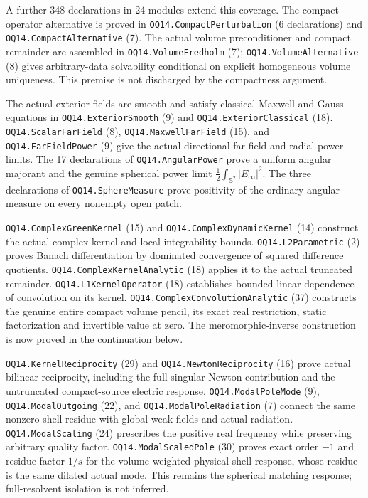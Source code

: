A further 348 declarations in 24 modules extend this coverage.
The compact-operator alternative is proved in
\texttt{OQ14.\allowbreak CompactPerturbation} (6 declarations) and
\texttt{OQ14.\allowbreak CompactAlternative} (7).
The actual volume preconditioner and compact remainder are assembled in
\texttt{OQ14.\allowbreak VolumeFredholm} (7);
\texttt{OQ14.\allowbreak VolumeAlternative} (8) gives arbitrary-data
solvability conditional on explicit homogeneous volume uniqueness.
This premise is not discharged by the compactness argument.

The actual exterior fields are smooth and satisfy classical Maxwell and
Gauss equations in \texttt{OQ14.\allowbreak ExteriorSmooth} (9) and
\texttt{OQ14.\allowbreak ExteriorClassical} (18).
\texttt{OQ14.\allowbreak ScalarFarField} (8),
\texttt{OQ14.\allowbreak MaxwellFarField} (15), and
\texttt{OQ14.\allowbreak FarFieldPower} (9) give the actual directional
far-field and radial power limits. The 17 declarations of
\texttt{OQ14.\allowbreak AngularPower} prove a uniform angular majorant
and the genuine spherical power limit
$\tfrac12\int_{\mathbb S^2}|E_\infty|^2$.
The three declarations of \texttt{OQ14.\allowbreak SphereMeasure} prove
positivity of the ordinary angular measure on every nonempty open patch.

\texttt{OQ14.\allowbreak ComplexGreenKernel} (15) and
\texttt{OQ14.\allowbreak ComplexDynamicKernel} (14) construct the actual
complex kernel and local integrability bounds.
\texttt{OQ14.\allowbreak L2Parametric} (2) proves Banach differentiation
by dominated convergence of squared difference quotients.
\texttt{OQ14.\allowbreak ComplexKernelAnalytic} (18) applies it to the
actual truncated remainder. \texttt{OQ14.\allowbreak L1KernelOperator}
(18) establishes bounded linear dependence of convolution on its kernel.
\texttt{OQ14.\allowbreak ComplexConvolutionAnalytic} (37) constructs the
genuine entire compact volume pencil, its exact real restriction, static
factorization and invertible value at zero. The meromorphic-inverse
construction is now proved in the continuation below.

\texttt{OQ14.\allowbreak KernelReciprocity} (29) and
\texttt{OQ14.\allowbreak NewtonReciprocity} (16) prove actual bilinear
reciprocity, including the full singular Newton contribution and the
untruncated compact-source electric response.
\texttt{OQ14.\allowbreak ModalPoleMode} (9),
\texttt{OQ14.\allowbreak ModalOutgoing} (22), and
\texttt{OQ14.\allowbreak ModalPoleRadiation} (7) connect the same
nonzero shell residue with global weak fields and actual radiation.
\texttt{OQ14.\allowbreak ModalScaling} (24) prescribes the positive real
frequency while preserving arbitrary quality factor.
\texttt{OQ14.\allowbreak ModalScaledPole} (30) proves exact order $-1$
and residue factor $1/s$ for the volume-weighted physical shell response,
whose residue is the same dilated actual mode. This remains the spherical
matching response; full-resolvent isolation is not inferred.

